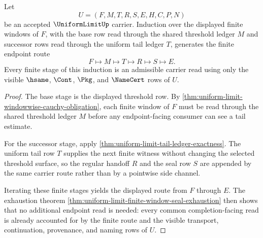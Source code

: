 \begin{theorem}
\label{thm:uniform-limit-finite-window-induction}
Let
$$
U=(F,M,T,R,S,E,H,C,P,N)
$$
be an accepted $\UniformLimitUp$ carrier. Induction over the displayed finite windows of $F$, with the base row read through the shared threshold ledger $M$ and successor rows read through the uniform tail ledger $T$, generates the finite endpoint route
$$
F \longmapsto M \longmapsto T \longmapsto R \longmapsto S \longmapsto E.
$$
Every finite stage of this induction is an admissible carrier read using only the visible $\hsame$, $\Cont$, $\Pkg$, and $\NameCert$ rows of $U$.
\end{theorem}
\begin{proof}
The base stage is the displayed threshold row. By \autoref{thm:uniform-limit-windowwise-cauchy-obligation}, each finite window of $F$ must be read through the shared threshold ledger $M$ before any endpoint-facing consumer can see a tail estimate.

For the successor stage, apply \autoref{thm:uniform-limit-tail-ledger-exactness}. The uniform tail row $T$ supplies the next finite witness without changing the selected threshold surface, so the regular handoff $R$ and the seal row $S$ are appended by the same carrier route rather than by a pointwise side channel.

Iterating these finite stages yields the displayed route from $F$ through $E$. The exhaustion theorem \autoref{thm:uniform-limit-finite-window-seal-exhaustion} then shows that no additional endpoint read is needed: every common completion-facing read is already accounted for by the finite route and the visible transport, continuation, provenance, and naming rows of $U$.
\end{proof}

